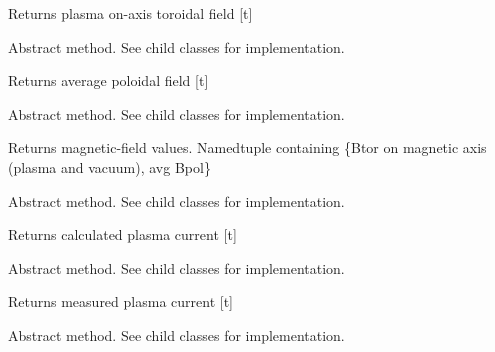 \documentclass[letterpaper,10pt,english]{sphinxmanual}
\begin{document}
\begin{fulllineitems}
\begin{fulllineitems}
Returns plasma on-axis toroidal field {[}t{]}

\end{fulllineitems}


\begin{fulllineitems}
\label{eqtools:eqtools.core.Equilibrium.getBpAvg}
Abstract method.  See child classes for implementation.

Returns average poloidal field {[}t{]}

\end{fulllineitems}


\begin{fulllineitems}
\label{eqtools:eqtools.core.Equilibrium.getFields}
Abstract method.  See child classes for implementation.

Returns magnetic-field values.
Namedtuple containing \{Btor on magnetic axis (plasma and vacuum), avg Bpol\}

\end{fulllineitems}


\begin{fulllineitems}
\label{eqtools:eqtools.core.Equilibrium.getIpCalc}
Abstract method.  See child classes for implementation.

Returns calculated plasma current {[}t{]}

\end{fulllineitems}


\begin{fulllineitems}
\label{eqtools:eqtools.core.Equilibrium.getIpMeas}
Abstract method.  See child classes for implementation.

Returns measured plasma current {[}t{]}

\end{fulllineitems}


\begin{fulllineitems}
\label{eqtools:eqtools.core.Equilibrium.getJp}
Abstract method.  See child classes for implementation.


\end{fulllineitems}
\end{fulllineitems}
\end{document}
